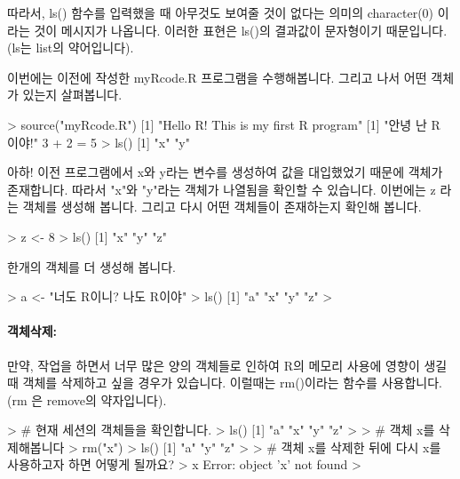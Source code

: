 \documentclass[tutorial.tex]{subfiles}
\begin{document}
\begin{Schunk}
\end{Schunk}
따라서, ls() 함수를 입력했을 때 아무것도 보여줄 것이 없다는 의미의 character(0) 이라는 것이 메시지가 나옵니다.
이러한 표현은 ls()의 결과값이 문자형이기 때문입니다.
(ls는 list의 약어입니다).

이번에는 이전에 작성한 myRcode.R 프로그램을 수행해봅니다.
그리고 나서 어떤 객체가 있는지 살펴봅니다.
\begin{Schunk}
\begin{Soutput}
> source("myRcode.R")
[1] "Hello R!  This is my first R program"
[1] "안녕 난 R 이야!"
3 + 2 = 5 
> ls()
[1] "x" "y"
\end{Soutput}
\end{Schunk}

아하! 이전 프로그램에서 x와 y라는 변수를 생성하여 값을 대입했었기 때문에 객체가 존재합니다. 
따라서 "x"와 "y"라는 객체가 나열됨을 확인할 수 있습니다.
이번에는 z 라는 객체를 생성해 봅니다.
그리고 다시 어떤 객체들이 존재하는지 확인해 봅니다. 

\begin{Schunk}
\begin{Soutput}
> z <- 8
> ls()
[1] "x" "y" "z"
\end{Soutput}
\end{Schunk}

한개의 객체를 더 생성해 봅니다. 

\begin{Schunk}
\begin{Soutput}
> a <- "너도 R이니?  나도 R이야"
> ls()
[1] "a" "x" "y" "z"
> 
\end{Soutput}
\end{Schunk}

\paragraph{객체삭제:} 만약, 작업을 하면서 너무 많은 양의 객체들로 인하여 R의 메모리 사용에 영향이 생길때 객체를 삭제하고 싶을 경우가 있습니다. 
이럴때는 rm()이라는 함수를 사용합니다.  
(rm 은 remove의 약자입니다).

\begin{Schunk}
\begin{Soutput}
> # 현재 세션의 객체들을 확인합니다. 
> ls()
[1] "a" "x" "y" "z"
>
> # 객체 x를 삭제해봅니다 
> rm("x")
> ls()
[1] "a" "y" "z"
> 
> # 객체 x를 삭제한 뒤에 다시 x를 사용하고자 하면 어떻게 될까요?
> x
Error: object 'x' not found
> 
\end{Soutput}
\end{Schunk}
\end{document}
